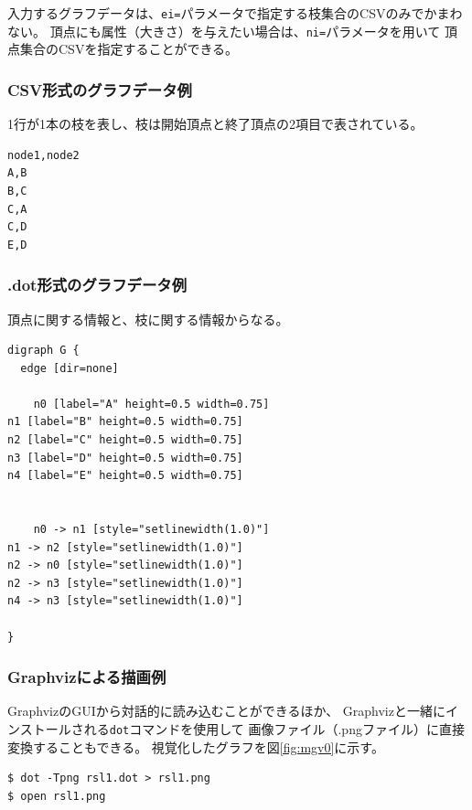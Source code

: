 入力するグラフデータは、\verb|ei=|パラメータで指定する枝集合のCSVのみでかまわない。
頂点にも属性（大きさ）を与えたい場合は、\verb|ni=|パラメータを用いて
頂点集合のCSVを指定することができる。

\subsubsection*{CSV形式のグラフデータ例}

1行が1本の枝を表し、枝は開始頂点と終了頂点の2項目で表されている。

\begin{Verbatim}[baselinestretch=0.7,frame=single]
node1,node2
A,B
B,C
C,A
C,D
E,D
\end{Verbatim}

\subsubsection*{.dot形式のグラフデータ例}

頂点に関する情報と、枝に関する情報からなる。

\begin{Verbatim}[baselinestretch=0.7,frame=single]
digraph G { 
  edge [dir=none]

    n0 [label="A" height=0.5 width=0.75] 
n1 [label="B" height=0.5 width=0.75] 
n2 [label="C" height=0.5 width=0.75] 
n3 [label="D" height=0.5 width=0.75] 
n4 [label="E" height=0.5 width=0.75] 


    n0 -> n1 [style="setlinewidth(1.0)"]
n1 -> n2 [style="setlinewidth(1.0)"]
n2 -> n0 [style="setlinewidth(1.0)"]
n2 -> n3 [style="setlinewidth(1.0)"]
n4 -> n3 [style="setlinewidth(1.0)"]

}
\end{Verbatim}

\subsubsection*{Graphvizによる描画例}

GraphvizのGUIから対話的に読み込むことができるほか、
Graphvizと一緒にインストールされる\verb|dot|コマンドを使用して
画像ファイル（.pngファイル）に直接変換することもできる。
視覚化したグラフを図\ref{fig:mgv0}に示す。

\begin{Verbatim}[baselinestretch=0.7,frame=single]
$ dot -Tpng rsl1.dot > rsl1.png
$ open rsl1.png
\end{Verbatim}


